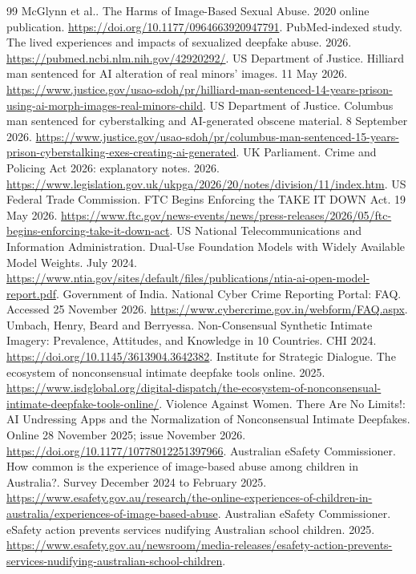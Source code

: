 \documentclass[10pt,a4paper]{article}
\begin{document}
\begin{thebibliography}{99}
 McGlynn et al.. The Harms of Image-Based Sexual Abuse. 2020 online publication. \url{https://doi.org/10.1177/0964663920947791}.
 PubMed-indexed study. The lived experiences and impacts of sexualized deepfake abuse. 2026. \url{https://pubmed.ncbi.nlm.nih.gov/42920292/}.
 US Department of Justice. Hilliard man sentenced for AI alteration of real minors' images. 11 May 2026. \url{https://www.justice.gov/usao-sdoh/pr/hilliard-man-sentenced-14-years-prison-using-ai-morph-images-real-minors-child}.
 US Department of Justice. Columbus man sentenced for cyberstalking and AI-generated obscene material. 8 September 2026. \url{https://www.justice.gov/usao-sdoh/pr/columbus-man-sentenced-15-years-prison-cyberstalking-exes-creating-ai-generated}.
 UK Parliament. Crime and Policing Act 2026: explanatory notes. 2026. \url{https://www.legislation.gov.uk/ukpga/2026/20/notes/division/11/index.htm}.
 US Federal Trade Commission. FTC Begins Enforcing the TAKE IT DOWN Act. 19 May 2026. \url{https://www.ftc.gov/news-events/news/press-releases/2026/05/ftc-begins-enforcing-take-it-down-act}.
 US National Telecommunications and Information Administration. Dual-Use Foundation Models with Widely Available Model Weights. July 2024. \url{https://www.ntia.gov/sites/default/files/publications/ntia-ai-open-model-report.pdf}.
 Government of India. National Cyber Crime Reporting Portal: FAQ. Accessed 25 November 2026. \url{https://www.cybercrime.gov.in/webform/FAQ.aspx}.
 Umbach, Henry, Beard and Berryessa. Non-Consensual Synthetic Intimate Imagery: Prevalence, Attitudes, and Knowledge in 10 Countries. CHI 2024. \url{https://doi.org/10.1145/3613904.3642382}.
 Institute for Strategic Dialogue. The ecosystem of nonconsensual intimate deepfake tools online. 2025. \url{https://www.isdglobal.org/digital-dispatch/the-ecosystem-of-nonconsensual-intimate-deepfake-tools-online/}.
 Violence Against Women. There Are No Limits!: AI Undressing Apps and the Normalization of Nonconsensual Intimate Deepfakes. Online 28 November 2025; issue November 2026. \url{https://doi.org/10.1177/10778012251397966}.
 Australian eSafety Commissioner. How common is the experience of image-based abuse among children in Australia?. Survey December 2024 to February 2025. \url{https://www.esafety.gov.au/research/the-online-experiences-of-children-in-australia/experiences-of-image-based-abuse}.
 Australian eSafety Commissioner. eSafety action prevents services nudifying Australian school children. 2025. \url{https://www.esafety.gov.au/newsroom/media-releases/esafety-action-prevents-services-nudifying-australian-school-children}.

\end{thebibliography}
\end{document}
